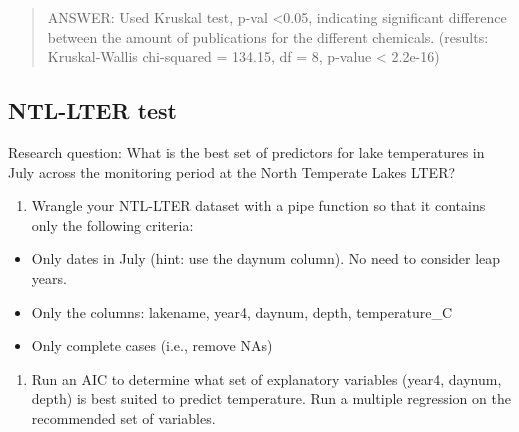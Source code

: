 \documentclass[]{article}
\providecommand{\tightlist}{%
  \setlength{\itemsep}{0pt}\setlength{\parskip}{0pt}}
\begin{document}
\begin{quote}
ANSWER: Used Kruskal test, p-val \textless{}0.05, indicating significant
difference between the amount of publications for the different
chemicals. (results: Kruskal-Wallis chi-squared = 134.15, df = 8,
p-value \textless{} 2.2e-16)
\end{quote}

\subsection{NTL-LTER test}\label{ntl-lter-test}

Research question: What is the best set of predictors for lake
temperatures in July across the monitoring period at the North Temperate
Lakes LTER?

\begin{enumerate}
\def\labelenumi{\arabic{enumi}.}
\setcounter{enumi}{10}
\tightlist
\item
  Wrangle your NTL-LTER dataset with a pipe function so that it contains
  only the following criteria:
\end{enumerate}

\begin{itemize}
\tightlist
\item
  Only dates in July (hint: use the daynum column). No need to consider
  leap years.
\item
  Only the columns: lakename, year4, daynum, depth, temperature\_C
\item
  Only complete cases (i.e., remove NAs)
\end{itemize}

\begin{enumerate}
\def\labelenumi{\arabic{enumi}.}
\setcounter{enumi}{11}
\tightlist
\item
  Run an AIC to determine what set of explanatory variables (year4,
  daynum, depth) is best suited to predict temperature. Run a multiple
  regression on the recommended set of variables.
\end{enumerate}
\end{document}
